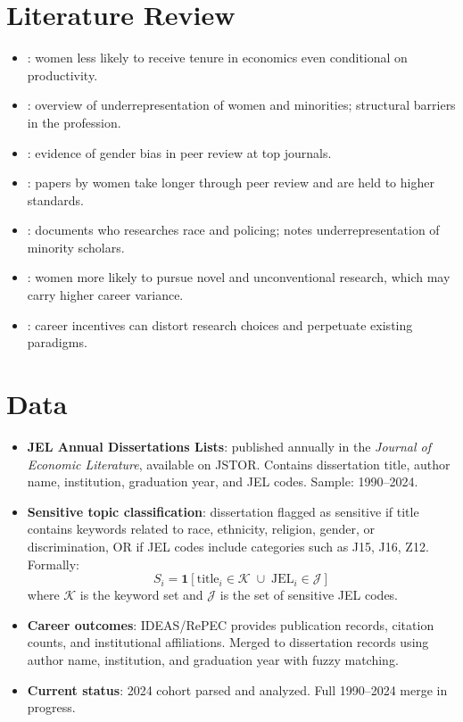 \documentclass[12pt,a4paper]{article}
\begin{document}
\section{Literature Review}
\label{sec:litreview}
\begin{itemize}
    \item \citet{ginther2004}: women less likely to receive tenure in economics even conditional on productivity.
    \item \citet{bayer2016}: overview of underrepresentation of women and minorities; structural barriers in the profession.
    \item \citet{card2020}: evidence of gender bias in peer review at top journals.
    \item \citet{hengel2022}: papers by women take longer through peer review and are held to higher standards.
    \item \citet{doleac2022}: documents who researches race and policing; notes underrepresentation of minority scholars.
    \item \citet{koffi2021}: women more likely to pursue novel and unconventional research, which may carry higher career variance.
    \item \citet{akerlof2020}: career incentives can distort research choices and perpetuate existing paradigms.
\end{itemize}

\section{Data}
\label{sec:data}
\begin{itemize}
    \item \textbf{JEL Annual Dissertations Lists}: published annually in the \textit{Journal of Economic Literature}, available on JSTOR. Contains dissertation title, author name, institution, graduation year, and JEL codes. Sample: 1990--2024.
    \item \textbf{Sensitive topic classification}: dissertation flagged as sensitive if title contains keywords related to race, ethnicity, religion, gender, or discrimination, OR if JEL codes include categories such as J15, J16, Z12. Formally:
    \begin{equation}
        S_i = \mathbf{1}\left[\text{title}_i \in \mathcal{K} \;\cup\; \text{JEL}_i \in \mathcal{J}\right]
    \end{equation}
    where $\mathcal{K}$ is the keyword set and $\mathcal{J}$ is the set of sensitive JEL codes.
    \item \textbf{Career outcomes}: IDEAS/RePEC provides publication records, citation counts, and institutional affiliations. Merged to dissertation records using author name, institution, and graduation year with fuzzy matching.
    \item \textbf{Current status}: 2024 cohort parsed and analyzed. Full 1990--2024 merge in progress.
\end{itemize}
\end{document}

